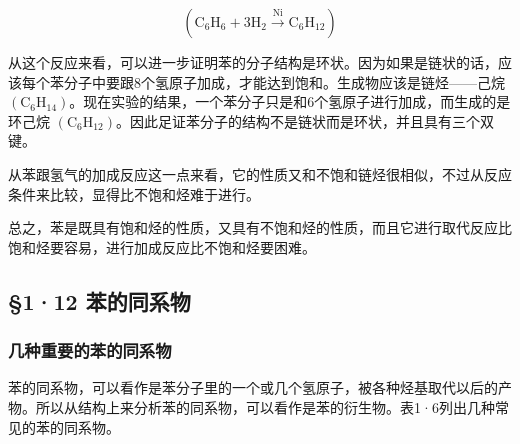 \[
\left(\mathrm{C} _ {6} \mathrm{H} _ {6} + 3 \mathrm{H} _ {2} \xrightarrow {\mathrm{Ni}} \mathrm{C} _ {6} \mathrm{H} _ {12}\right)
\]

从这个反应来看，可以进一步证明苯的分子结构是环状。因为如果是链状的话，应该每个苯分子中要跟8个氢原子加成，才能达到饱和。生成物应该是链烃------己烷
\(\left(\mathrm{C}_{6}\mathrm{H}_{14}\right)\)。现在实验的结果，一个苯分子只是和6个氢原子进行加成，而生成的是环己烷
\(\left(\mathrm{C}_{6}\mathrm{H}_{12}\right)\)。因此足证苯分子的结构不是链状而是环状，并且具有三个双键。

从苯跟氢气的加成反应这一点来看，它的性质又和不饱和链烃很相似，不过从反应条件来比较，显得比不饱和烃难于进行。

总之，苯是既具有饱和烃的性质，又具有不饱和烃的性质，而且它进行取代反应比饱和烃要容易，进行加成反应比不饱和烃要困难。

\subsection{§1·12 苯的同系物}

\subsubsection{几种重要的苯的同系物}

苯的同系物，可以看作是苯分子里的一个或几个氢原子，被各种烃基取代以后的产物。所以从结构上来分析苯的同系物，可以看作是苯的衍生物。表1·6列出几种常见的苯的同系物。

